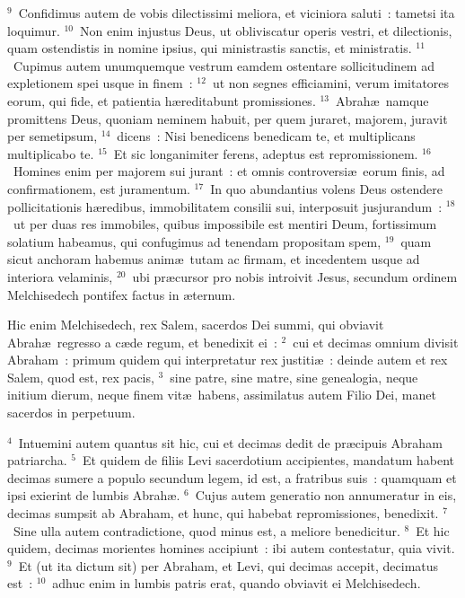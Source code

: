 ${}^{9}$~Confidimus autem de vobis dilectissimi meliora, et viciniora saluti~: tametsi ita loquimur.
${}^{10}$~Non enim injustus Deus, ut obliviscatur operis vestri, et dilectionis, quam ostendistis in nomine ipsius, qui ministrastis sanctis, et ministratis.
${}^{11}$~Cupimus autem unumquemque vestrum eamdem ostentare sollicitudinem ad expletionem spei usque in finem~:
${}^{12}$~ut non segnes efficiamini, verum imitatores eorum, qui fide, et patientia h\ae reditabunt promissiones.
${}^{13}$~Abrah\ae\ namque promittens Deus, quoniam neminem habuit, per quem juraret, majorem, juravit per semetipsum,
${}^{14}$~dicens~: Nisi benedicens benedicam te, et multiplicans multiplicabo te.
${}^{15}$~Et sic longanimiter ferens, adeptus est repromissionem.
${}^{16}$~Homines enim per majorem sui jurant~: et omnis controversi\ae\ eorum finis, ad confirmationem, est juramentum.
${}^{17}$~In quo abundantius volens Deus ostendere pollicitationis h\ae redibus, immobilitatem consilii sui, interposuit jusjurandum~:
${}^{18}$~ut per duas res immobiles, quibus impossibile est mentiri Deum, fortissimum solatium habeamus, qui confugimus ad tenendam propositam spem,
${}^{19}$~quam sicut anchoram habemus anim\ae\ tutam ac firmam, et incedentem usque ad interiora velaminis,
${}^{20}$~ubi pr\ae cursor pro nobis introivit Jesus, secundum ordinem Melchisedech pontifex factus in \ae ternum.

\lettrine[lines=3,image=true,loversize=0.05,lraise=-0.03]{H}{}ic enim Melchisedech, rex Salem, sacerdos Dei summi, qui obviavit Abrah\ae\ regresso a c\ae de regum, et benedixit ei~:
${}^{2}$~cui et decimas omnium divisit Abraham~: primum quidem qui interpretatur rex justiti\ae~: deinde autem et rex Salem, quod est, rex pacis,
${}^{3}$~sine patre, sine matre, sine genealogia, neque initium dierum, neque finem vit\ae\ habens, assimilatus autem Filio Dei, manet sacerdos in perpetuum.


${}^{4}$~Intuemini autem quantus sit hic, cui et decimas dedit de pr\ae cipuis Abraham patriarcha.
${}^{5}$~Et quidem de filiis Levi sacerdotium accipientes, mandatum habent decimas sumere a populo secundum legem, id est, a fratribus suis~: quamquam et ipsi exierint de lumbis Abrah\ae .
${}^{6}$~Cujus autem generatio non annumeratur in eis, decimas sumpsit ab Abraham, et hunc, qui habebat repromissiones, benedixit.
${}^{7}$~Sine ulla autem contradictione, quod minus est, a meliore benedicitur.
${}^{8}$~Et hic quidem, decimas morientes homines accipiunt~: ibi autem contestatur, quia vivit.
${}^{9}$~Et (ut ita dictum sit) per Abraham, et Levi, qui decimas accepit, decimatus est~:
${}^{10}$~adhuc enim in lumbis patris erat, quando obviavit ei Melchisedech.


